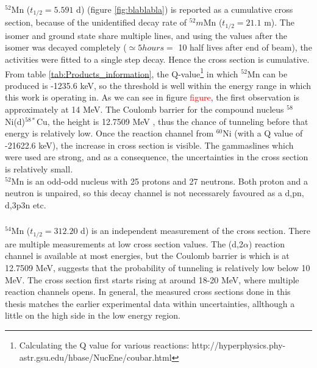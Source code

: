 \subsubsection{}
$^{52}$Mn ($t_{1/2}=5.591$ d) (figure \ref{fig:blablabla}) is reported as a cumulative cross section, because of the unidentified decay rate of $^{52}m$Mn ($t_{1/2}=21.1$ m). The isomer and ground state share multiple lines, and using the values after the isomer was decayed completely ($\simeq 5 hours =$ 10 half lives after end of beam), the activities were fitted to a single step decay. Hence the cross section is cumulative. From table \ref{tab:Products_information}, the Q-value\footnote{Calculating the Q value for various reactions: http://hyperphysics.phy-astr.gsu.edu/hbase/NucEne/coubar.html} in which $^{52}$Mn can be produced is -1235.6 keV, so the threshold is well within the energy range in which this work is operating in. As we can see in figure \textcolor{red}{figure}, the first observation is approximately at 14 MeV. The Coulomb barrier for the compound nucleus $^{58}$Ni(d)$^{58*}$Cu, the height is 12.7509 MeV \textcolor{(calculated from equation in theory)}, thus the chance of tunneling before that energy is relatively low. Once the reaction channel from $^{60}$Ni (with a Q value of -21622.6 keV), the increase in cross section is visible. The gammaslines which were used are strong, and as a consequence, the uncertainties in the cross section is relatively small. \\ 

$^{52}$Mn is an odd-odd nucleus with 25 protons and 27 neutrons. Both proton and a neutron is unpaired, so this decay channel is not necessarely favoured as a d,pn, d,3p3n etc. 

 
\subsubsection{}
$^{54}$Mn ($t_{1/2}=312.20$ d) is an independent measurement of the cross section. There are multiple measurements at low cross section values.  The (d,2$\alpha$) reaction channel is available at most energies, but the Coulomb barrier is which is at 12.7509 MeV, suggests that the probability of tunneling is relatively low below 10 MeV. The cross section first starts rising at around 18-20 MeV, where multiple reaction channels opens. In general, the measured cross sections done in this thesis matches the earlier experimental data within uncertainties, allthough a little on the high side in the low energy region. 

